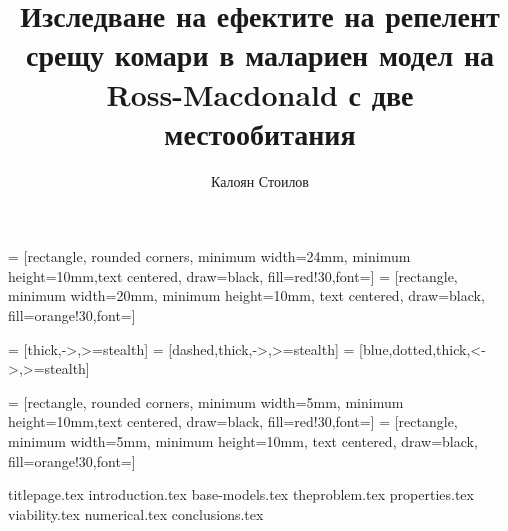 \documentclass[bulgarian, 12pt]{article}
\title{Изследване на ефектите на репелент срещу комари в малариен модел на Ross-Macdonald с две местообитания}
\author{Калоян Стоилов}
\theoremstyle{definition}
\begin{document}

\usetikzlibrary{shapes,fit}
\tikzset{>=latex}
\usetikzlibrary{shapes.geometric, arrows.meta}

 = [rectangle, rounded corners, minimum width=24mm, minimum height=10mm,text centered, draw=black, fill=red!30,font=\small ]
 = [rectangle, minimum width=20mm, minimum height=10mm, text centered, draw=black, fill=orange!30,font=\small ]

 = [thick,->,>=stealth]
 = [dashed,thick,->,>=stealth]
 = [blue,dotted,thick,<->,>=stealth]

 = [rectangle, rounded corners, minimum width=5mm, minimum height=10mm,text centered, draw=black, fill=red!30,font=\small ]
 = [rectangle, minimum width=5mm, minimum height=10mm, text centered, draw=black, fill=orange!30,font=\small ]

{titlepage.tex}
\tableofcontents
\thispagestyle{empty}
\newpage
\setcounter{page}{1}
{introduction.tex}
{base-models.tex}
{theproblem.tex}
{properties.tex}
{viability.tex}
{numerical.tex}
{conclusions.tex}
\pagebreak
\printbibliography[heading=bibintoc]
% 
% 
\end{document}
